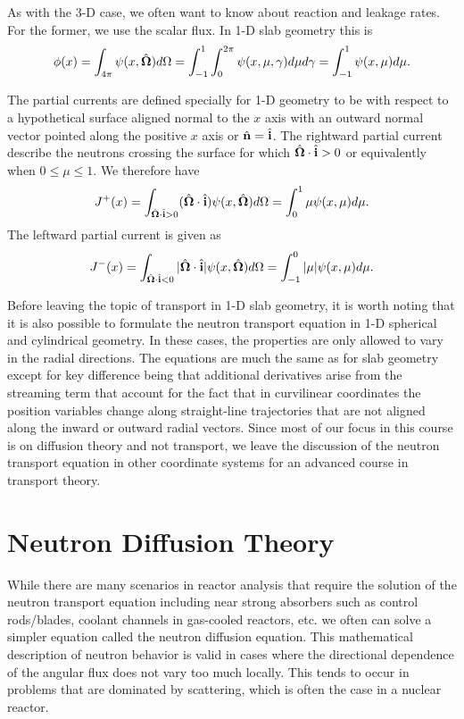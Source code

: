 As with the 3-D case, we often want to know about reaction and leakage rates. For the former, we use the scalar flux. In 1-D slab geometry this is
\begin{align}
  \phi(x) = \int_{4\pi} \psi(x,\hat{\mathbf{\Omega}}) d\Omega =
  \int_{-1}^1 \int_0^{2\pi} \psi(x,\mu,\gamma ) d\mu d\gamma = \int_{-1}^1 \psi(x,\mu) d\mu .
\end{align}

The partial currents are defined specially for 1-D geometry to be with respect to a hypothetical surface aligned normal to the $x$ axis with an outward normal vector pointed along the positive $x$ axis or $\hat{\mathbf{n}} = \hat{\mathbf{i}}$. The rightward partial current describe the neutrons crossing the surface for which $\hat{\mathbf{\Omega}} \cdot \hat{\mathbf{i}} > 0$ or equivalently when $0 \le \mu \le 1$. We therefore have
\begin{align}
  J^+(x) =  \int_{\hat{\mathbf{\Omega}} \cdot \hat{\mathbf{i}} > 0} ( \hat{\mathbf{\Omega}} \cdot \hat{\mathbf{i}}) \psi(x,\hat{\mathbf{\Omega}} ) d\Omega
        = \int_0^1 \mu \psi(x,\mu) d\mu .
\end{align}
The leftward partial current is given as
\begin{align}
  J^-(x) =  \int_{\hat{\mathbf{\Omega}} \cdot \hat{\mathbf{i}} < 0} | \hat{\mathbf{\Omega}} \cdot \hat{\mathbf{i}} | \psi(x,\hat{\mathbf{\Omega}} ) d\Omega
        = \int_{-1}^0 | \mu | \psi(x,\mu) d\mu .
\end{align}

Before leaving the topic of transport in 1-D slab geometry, it is worth noting that it is also possible to formulate the neutron transport equation in 1-D spherical and cylindrical geometry. In these cases, the properties are only allowed to vary in the radial directions. The equations are much the same as for slab geometry except for key difference being that additional derivatives arise from the streaming term that account for the fact that in curvilinear coordinates the position variables change along straight-line trajectories that are not aligned along the inward or outward radial vectors. Since most of our focus in this course is on diffusion theory and not transport, we leave the discussion of the neutron transport equation in other coordinate systems for an advanced course in transport theory.

\section{Neutron Diffusion Theory}

While there are many scenarios in reactor analysis that require the solution of the neutron transport equation including near strong absorbers such as control rods/blades, coolant channels in gas-cooled reactors, etc. we often can solve a simpler equation called the neutron diffusion equation. This mathematical description of neutron behavior is valid in cases where the directional dependence of the angular flux does not vary too much locally. This tends to occur in problems that are dominated by scattering, which is often the case in a nuclear reactor.

